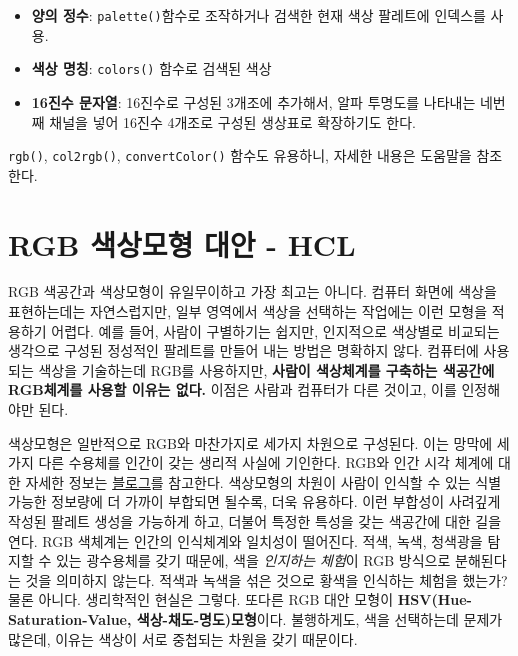 \documentclass[
  letterpaper,
]{book}
\providecommand{\tightlist}{%
  \setlength{\itemsep}{0pt}\setlength{\parskip}{0pt}}\usepackage{longtable,booktabs,array}
\begin{document}
\begin{itemize}
\tightlist
\item
  \textbf{양의 정수}: \texttt{palette()}함수로 조작하거나 검색한 현재
  색상 팔레트에 인덱스를 사용.
\item
  \textbf{색상 명칭}: \texttt{colors()} 함수로 검색된 색상
\item
  \textbf{16진수 문자열}: 16진수로 구성된 3개조에 추가해서, 알파
  투명도를 나타내는 네번째 채널을 넣어 16진수 4개조로 구성된 생상표로
  확장하기도 한다.
\end{itemize}

\texttt{rgb()}, \texttt{col2rgb()}, \texttt{convertColor()} 함수도
유용하니, 자세한 내용은 도움말을 참조한다.

\hypertarget{dataviz-mechanism-hcl}{%
\section{\texorpdfstring{RGB 색상모형 대안 -
\textbf{HCL}}{RGB 색상모형 대안 - HCL}}\label{dataviz-mechanism-hcl}}

RGB 색공간과 색상모형이 유일무이하고 가장 최고는 아니다. 컴퓨터 화면에
색상을 표현하는데는 자연스럽지만, 일부 영역에서 색상을 선택하는 작업에는
이런 모형을 적용하기 어렵다. 예를 들어, 사람이 구별하기는 쉽지만,
인지적으로 색상별로 비교되는 생각으로 구성된 정성적인 팔레트를 만들어
내는 방법은 명확하지 않다. 컴퓨터에 사용되는 색상을 기술하는데 RGB를
사용하지만, \textbf{사람이 색상체계를 구축하는 색공간에 RGB체계를 사용할
이유는 없다.} 이점은 사람과 컴퓨터가 다른 것이고, 이를 인정해야만 된다.

색상모형은 일반적으로 RGB와 마찬가지로 세가지 차원으로 구성된다. 이는
망막에 세가지 다른 수용체를 인간이 갖는 생리적 사실에 기인한다. RGB와
인간 시각 체계에 대한 자세한 정보는
\href{http://manyworldstheory.com/2013/01/15/my-favorite-rgb-color/}{블로그}를
참고한다. 색상모형의 차원이 사람이 인식할 수 있는 식별가능한 정보량에 더
가까이 부합되면 될수록, 더욱 유용하다. 이런 부합성이 사려깊게 작성된
팔레트 생성을 가능하게 하고, 더불어 특정한 특성을 갖는 색공간에 대한
길을 연다. RGB 색체계는 인간의 인식체계와 일치성이 떨어진다. 적색, 녹색,
청색광을 탐지할 수 있는 광수용체를 갖기 때문에, 색을 \emph{인지하는
체험}이 RGB 방식으로 분해된다는 것을 의미하지 않는다. 적색과 녹색을 섞은
것으로 황색을 인식하는 체험을 했는가? 물론 아니다. 생리학적인 현실은
그렇다. 또다른 RGB 대안 모형이 \textbf{HSV(Hue-Saturation-Value,
색상-채도-명도)모형}이다. 불행하게도, 색을 선택하는데 문제가 많은데,
이유는 색상이 서로 중첩되는 차원을 갖기 때문이다.
\end{document}
